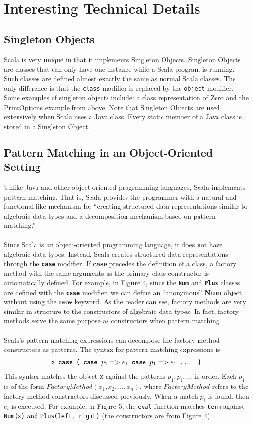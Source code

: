 \documentclass[jou,apacite]{IEEEtran}
\begin{document}
\section{Interesting Technical Details}
\label{sec:interesting-tech}

\subsection{Singleton Objects}
Scala is very unique in that it implements Singleton Objects. Singleton Objects are classes that can only have one instance while a Scala program is running. Such classes are defined almost exactly the same as normal Scala classes. The only difference is that the \texttt{class} modifier is replaced by the \texttt{object} modifier. Some examples of singleton objects include: a class representation of Zero and the PrintOptions example from above. Note that Singleton Objects are used extensively when Scala uses a Java class. Every static member of a Java class is stored in a Singleton Object.

\subsection{Pattern Matching in an Object-Oriented Setting}
Unlike Java and other object-oriented programming languages, Scala implements pattern matching. That is, Scala provides the programmer with a natural and functional-like mechanism for ``creating structured data representations similar to algebraic data types and a decomposition mechanism based on pattern matching.'' \\\\
Since Scala is an object-oriented programming language, it does not have algebraic data types. Instead, Scala creates structured data representations through the \texttt{\textbf{case}} modifier. If $\textbf{case}$ precedes the definition of a class, a factory method with the same arguments as the primary class constructor is automatically defined. For example, in Figure 4, since the \texttt{\textbf{Num}} and \texttt{\textbf{Plus}} classes are defined with the \texttt{\textbf{case}} modifier, we can define an “anonymous” \textbf{Num} object without using the \textbf{new} keyword. As the reader can see, factory methods are very similar in structure to the constructors of algebraic data types. In fact, factory methods serve the same purpose as constructors when pattern matching.\\\\
Scala's pattern matching expressions can decompose the factory method constructors as patterns. The syntax for pattern matching expressions is 
\[
    \texttt{x \textbf{case} \{ \textbf{case} $p_1 => e_1$ \textbf{case} $p_1 => e_1$ ... \}}
\]
This syntax matches the object \texttt{x} against the patterns $p_1, p_2, ...$ in order. Each $p_1$ is of the form $FactoryMethod(x_1, x_2, …, x_n)$, where $FactoryMethod$ refers to the factory method constructors discussed previously. When a match $p_i$ is found, then $e_i$ is executed. For example, in Figure 5, the \texttt{eval} function matches \texttt{term} against \texttt{Num(x)} and \texttt{Plus(left, right)} (the constructors are from Figure 4).
\end{document}
